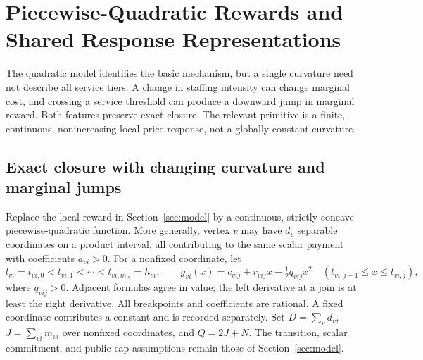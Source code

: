 \section{Piecewise-Quadratic Rewards and Shared Response Representations}\label{sec:r33-extension}
The quadratic model identifies the basic mechanism, but a single curvature need not describe all service tiers. A change in staffing intensity can change marginal cost, and crossing a service threshold can produce a downward jump in marginal reward. Both features preserve exact closure. The relevant primitive is a finite, continuous, nonincreasing local price response, not a globally constant curvature.

\subsection{Exact closure with changing curvature and marginal jumps}
Replace the local reward in Section~\ref{sec:model} by a continuous, strictly concave piecewise-quadratic function. More generally, vertex $v$ may have $d_v$ separable coordinates on a product interval, all contributing to the same scalar payment with coefficients $a_{vi}>0$. For a nonfixed coordinate, let
\[
 l_{vi}=t_{vi,0}<t_{vi,1}<\cdots<t_{vi,m_{vi}}=h_{vi},\qquad
 g_{vi}(x)=c_{vij}+r_{vij}x-\tfrac12q_{vij}x^2
 \quad(t_{vi,j-1}\leq x\leq t_{vi,j}),
\]
where $q_{vij}>0$. Adjacent formulas agree in value; the left derivative at a join is at least the right derivative. All breakpoints and coefficients are rational. A fixed coordinate contributes a constant and is recorded separately. Set $D=\sum_vd_v$, $J=\sum_{vi}m_{vi}$ over nonfixed coordinates, and $Q=2J+N$. The transition, scalar commitment, and public cap assumptions remain those of Section~\ref{sec:model}.

